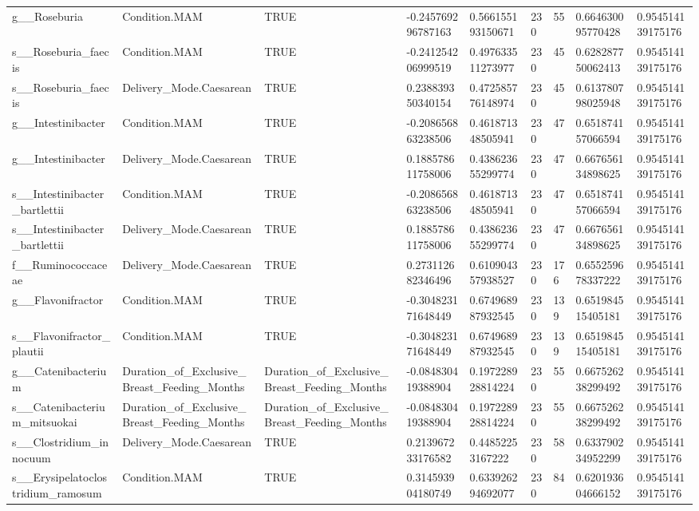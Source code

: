 \begin{longtable}{lllllllll}
g\_\_Roseburia & Condition.MAM & TRUE & -0.245769296787163 & 0.566155193150671 & 230 & 55 & 0.664630095770428 & 0.954514139175176 \\
s\_\_Roseburia\_faecis & Condition.MAM & TRUE & -0.241254206999519 & 0.497633511273977 & 230 & 45 & 0.628287750062413 & 0.954514139175176 \\
s\_\_Roseburia\_faecis & Delivery\_Mode.Caesarean & TRUE & 0.238839350340154 & 0.472585776148974 & 230 & 45 & 0.613780798025948 & 0.954514139175176 \\
g\_\_Intestinibacter & Condition.MAM & TRUE & -0.208656863238506 & 0.461871348505941 & 230 & 47 & 0.651874157066594 & 0.954514139175176 \\
g\_\_Intestinibacter & Delivery\_Mode.Caesarean & TRUE & 0.188578611758006 & 0.438623655299774 & 230 & 47 & 0.667656134898625 & 0.954514139175176 \\
s\_\_Intestinibacter\_bartlettii & Condition.MAM & TRUE & -0.208656863238506 & 0.461871348505941 & 230 & 47 & 0.651874157066594 & 0.954514139175176 \\
s\_\_Intestinibacter\_bartlettii & Delivery\_Mode.Caesarean & TRUE & 0.188578611758006 & 0.438623655299774 & 230 & 47 & 0.667656134898625 & 0.954514139175176 \\
f\_\_Ruminococcaceae & Delivery\_Mode.Caesarean & TRUE & 0.273112682346496 & 0.610904357938527 & 230 & 176 & 0.655259678337222 & 0.954514139175176 \\
g\_\_Flavonifractor & Condition.MAM & TRUE & -0.304823171648449 & 0.674968987932545 & 230 & 139 & 0.651984515405181 & 0.954514139175176 \\
s\_\_Flavonifractor\_plautii & Condition.MAM & TRUE & -0.304823171648449 & 0.674968987932545 & 230 & 139 & 0.651984515405181 & 0.954514139175176 \\
g\_\_Catenibacterium & Duration\_of\_Exclusive\_Breast\_Feeding\_Months & Duration\_of\_Exclusive\_Breast\_Feeding\_Months & -0.084830419388904 & 0.197228928814224 & 230 & 55 & 0.667526238299492 & 0.954514139175176 \\
s\_\_Catenibacterium\_mitsuokai & Duration\_of\_Exclusive\_Breast\_Feeding\_Months & Duration\_of\_Exclusive\_Breast\_Feeding\_Months & -0.084830419388904 & 0.197228928814224 & 230 & 55 & 0.667526238299492 & 0.954514139175176 \\
s\_\_Clostridium\_innocuum & Delivery\_Mode.Caesarean & TRUE & 0.213967233176582 & 0.44852253167222 & 230 & 58 & 0.633790234952299 & 0.954514139175176 \\
s\_\_Erysipelatoclostridium\_ramosum & Condition.MAM & TRUE & 0.314593904180749 & 0.633926294692077 & 230 & 84 & 0.620193604666152 & 0.954514139175176 \\

\end{longtable}
